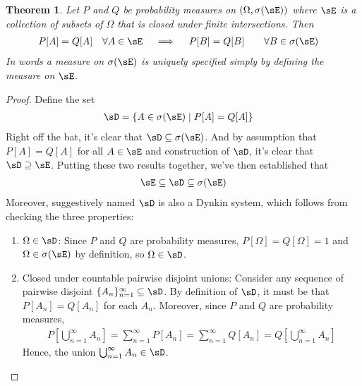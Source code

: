 \documentclass[12pt]{article}
\theoremstyle{plain}
\newtheorem{thm}{Theorem}[section]
\theoremstyle{definition}
\theoremstyle{remark}
\newcommand{\sumninf}{\sum^\infty_{n=1}}
\newcommand{\ninf}{_{n=1}^\infty}
\begin{document}
\begin{thm}
\label{thm:PQunq}
Let $P$ and $Q$ be probability measures on $(\Omega,\sigma(\sE))$ where
$\sE$ is a collection of subsets of $\Omega$ that is closed under finite
intersections. Then
\begin{align*}
  P[A] &= Q[A]
  \quad\forall A\in\sE
  \quad\implies\quad
  P[B] = Q[B]
  \qquad \forall B\in\sigma(\sE)
\end{align*}
In words a measure on $\sigma(\sE)$ is \emph{uniquely} specified simply
by defining the measure on $\sE$.
\end{thm}
\begin{proof}
Define the set
\begin{align*}
  \sD &= \left\{ A\in\sigma(\sE) \;|\; P[A]=Q[A]  \right\}
\end{align*}
Right off the bat, it's clear that $\sD\subseteq \sigma(\sE)$. And
by assumption that $P[A]=Q[A]$ for all $A\in \sE$ and construction of
$\sD$, it's clear that $\sD\supseteq \sE$. Putting these two results
together, we've then established that
\begin{align}
  \sE \subseteq \sD \subseteq \sigma(\sE)
  \label{Dsqueeze}
\end{align}
Moreover, suggestively named $\sD$ is also a Dynkin system, which
follows from checking the three properties:
\begin{enumerate}
  \item $\Omega\in\sD$: Since $P$ and $Q$ are probability measures,
    $P[\Omega]=Q[\Omega]=1$ and $\Omega\in\sigma(\sE)$ by definition, so
    $\Omega\in\sD$.
  \item Closed under countable pairwise disjoint unions:
    Consider any sequence of pairwise disjoint $\{A_n\}\ninf\subseteq
    \sD$.  By definition of $\sD$, it must be that $P[A_n]=Q[A_n]$ for
    each $A_n$. Moreover, since $P$ and $Q$ are probability measures,
    \begin{align*}
      P\left[\bigcup\ninf A_n\right]
      =
      \sumninf P\left[A_n\right]
      =
      \sumninf Q\left[A_n\right]
      =
      Q\left[\bigcup\ninf A_n\right]
    \end{align*}
    Hence, the union $\bigcup\ninf A_n\in \sD$.


\end{enumerate}
\end{proof}
\end{document}
